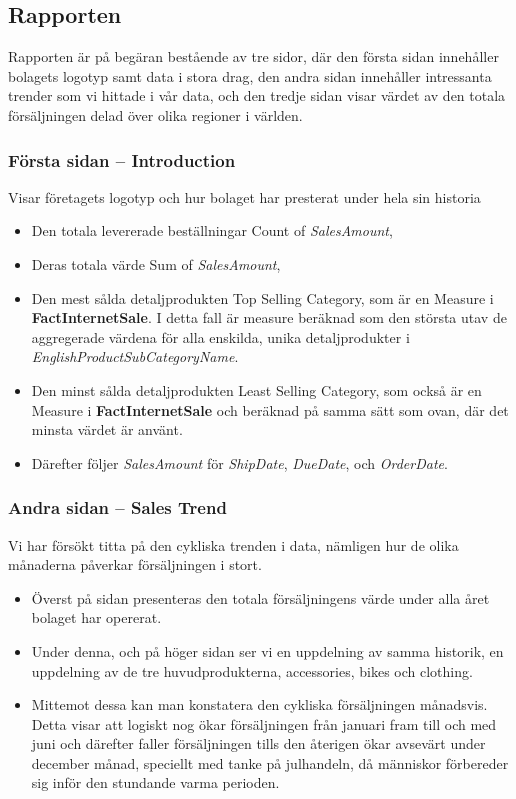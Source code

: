 \documentclass[10pt]{article}
\begin{document}
\subsection{Rapporten}

Rapporten är på begäran bestående av tre sidor, där den första sidan innehåller bolagets logotyp samt data i stora drag, den andra sidan innehåller intressanta trender som vi hittade i vår data, och den tredje sidan visar värdet av den totala försäljningen delad över olika regioner i världen.

\subsubsection{Första sidan -- Introduction}

Visar företagets logotyp och hur bolaget har presterat under hela sin historia

\begin{itemize}
	\item Den totala levererade beställningar Count of \emph{SalesAmount},
	\item Deras totala värde Sum of \emph{SalesAmount},
	\item Den mest sålda detaljprodukten Top Selling Category, som är en Measure i \textbf{FactInternetSale}. I detta fall är measure beräknad som den största utav de aggregerade värdena för alla enskilda, unika detaljprodukter i \emph{EnglishProductSubCategoryName}.
	\item Den minst sålda detaljprodukten Least Selling Category, som också är en Measure i \textbf{FactInternetSale} och beräknad på samma sätt som ovan, där det minsta värdet är använt.
	\item Därefter följer \emph{SalesAmount} för \emph{ShipDate}, \emph{DueDate}, och \emph{OrderDate}.
\end{itemize}

\subsubsection{Andra sidan -- Sales Trend}

Vi har försökt titta på den cykliska trenden i data, nämligen hur de olika månaderna påverkar försäljningen i stort.

\begin{itemize}
	\item Överst på sidan presenteras den totala försäljningens värde under alla året bolaget har opererat.
	\item Under denna, och på höger sidan ser vi en uppdelning av samma historik, en uppdelning av de tre huvudprodukterna, accessories, bikes och clothing.
	\item Mittemot dessa kan man konstatera den cykliska försäljningen månadsvis. Detta visar att logiskt nog ökar försäljningen från januari fram till och med juni och därefter faller försäljningen tills den återigen ökar avsevärt under december månad, speciellt med tanke på julhandeln, då människor förbereder sig inför den stundande varma perioden.
\end{itemize}
\end{document}
